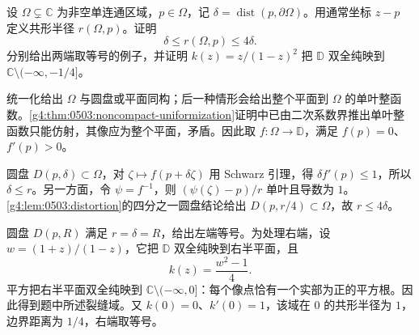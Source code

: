 \begin{exercise}
	\label{g4:ex:0503:radius-distance}
	设 \(\Omega\subsetneq\mathbb C\) 为非空单连通区域，\(p\in\Omega\)，记 \(\delta=\operatorname{dist}(p,\partial\Omega)\)。用通常坐标 \(z-p\) 定义共形半径 \(r(\Omega,p)\)。证明
	\[
		\delta\le r(\Omega,p)\le4\delta.
	\]
	分别给出两端取等号的例子，并证明 \(k(z)=z/(1-z)^2\) 把 \(\mathbb D\) 双全纯映到 \(\mathbb C\setminus(-\infty,-1/4]\)。
\end{exercise}
\begin{solution}
	统一化给出 \(\Omega\) 与圆盘或平面同构；后一种情形会给出整个平面到 \(\Omega\) 的单叶整函数。\cref{g4:thm:0503:noncompact-uniformization}证明中已由二次系数界推出单叶整函数只能仿射，其像应为整个平面，矛盾。因此取 \(f:\Omega\to\mathbb D\)，满足 \(f(p)=0\)、\(f'(p)>0\)。

	圆盘 \(D(p,\delta)\subset\Omega\)，对 \(\zeta\mapsto f(p+\delta\zeta)\) 用 Schwarz 引理，得 \(\delta f'(p)\le1\)，所以 \(\delta\le r\)。另一方面，令 \(\psi=f^{-1}\)，则 \((\psi(\zeta)-p)/r\) 单叶且导数为 \(1\)。\cref{g4:lem:0503:distortion}的四分之一圆盘结论给出 \(D(p,r/4)\subset\Omega\)，故 \(r\le4\delta\)。

	圆盘 \(D(p,R)\) 满足 \(r=\delta=R\)，给出左端等号。为处理右端，设 \(w=(1+z)/(1-z)\)，它把 \(\mathbb D\) 双全纯映到右半平面，且
	\[
		k(z)=\frac{w^2-1}{4}.
	\]
	平方把右半平面双全纯映到 \(\mathbb C\setminus(-\infty,0]\)：每个像点恰有一个实部为正的平方根。因此得到题中所述裂缝域。又 \(k(0)=0\)、\(k'(0)=1\)，该域在 \(0\) 的共形半径为 \(1\)，边界距离为 \(1/4\)，右端取等号。
\end{solution}

